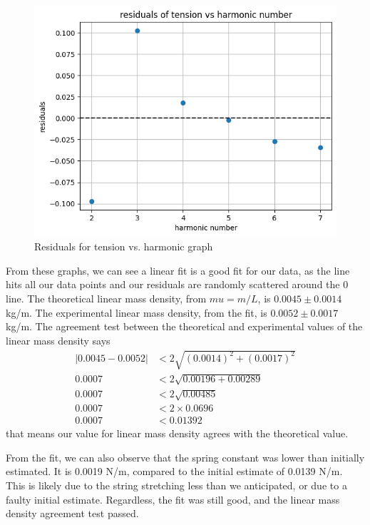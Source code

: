 \documentclass[11pt]{article}
\begin{document}
    \begin{figure}[H]
        \includegraphics[width=1\textwidth]{resources/images/p2 measured tension residuals}
        \caption{Residuals for tension vs. harmonic graph}
        \label{fig:measured_tension_residuals}
    \end{figure}

    From these graphs, we can see a linear fit is a good fit for our data, as the line hits all our data points and our residuals are randomly scattered around the 0 line.
    The theoretical linear mass density, from $mu = m / L$, is $0.0045 \pm 0.0014$ kg/m.
    The experimental linear mass density, from the fit, is $0.0052 \pm 0.0017$ kg/m.
    The agreement test between the theoretical and experimental values of the linear mass density says
    \begin{align*}
        |0.0045 - 0.0052| &< 2 \sqrt{(0.0014)^2 + (0.0017)^2} \\
        0.0007 &< 2 \sqrt{0.00196 + 0.00289} \\
        0.0007 &< 2 \sqrt{0.00485} \\
        0.0007 &< 2 \times 0.0696 \\
        0.0007 &< 0.01392
    \end{align*}
    that means our value for linear mass density agrees with the theoretical value.

    From the fit, we can also observe that the spring constant was lower than initially estimated.
    It is 0.0019 N/m, compared to the initial estimate of 0.0139 N/m.
    This is likely due to the string stretching less than we anticipated, or due to a faulty initial estimate.
    Regardless, the fit was still good, and the linear mass density agreement test passed.
\end{document}
